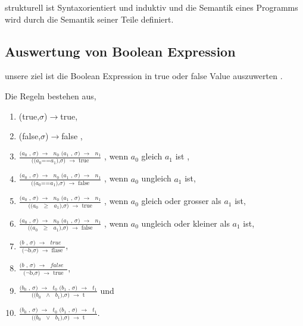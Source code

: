 \documentclass[a4paper,12pt,twoside,headsepline]{scrartcl}
\begin{document}
 strukturell ist Syntaxorientiert und induktiv und  die Semantik eines Programms wird durch  die Semantik seiner Teile definiert.
              
\subsection{Auswertung von Boolean Expression}  

unsere ziel ist die Boolean Expression in true oder false Value auszuwerten . 

     
 Die Regeln bestehen aus, 
 \begin{enumerate}
 \item \label{11} (true,$\sigma$)$\to$true, 
	\item \label{12} (false,$\sigma$)$\to$false ,
	\item \label{13}  $\frac  {\text {($a_0$ , $\sigma$) $\to$ $n_0$   ($a_1$ , $\sigma$) $\to$ $n_1$} } { \text{(($a_0$==$a_1$),$\sigma$) $\to$ true} }$  
	, wenn $a_0$ gleich $a_1$ ist ,
	\item \label{14}  $\frac  {\text {($a_0$ , $\sigma$) $\to$ $n_0$   ($a_1$ , $\sigma$) $\to$ $n_1$} } { \text{(($a_0$==$a_1$),$\sigma$) $\to$ false} }$
	, wenn $a_0$ ungleich $a_1$ ist,
	\item \label{15}  $\frac  {\text {($a_0$ , $\sigma$) $\to$ $n_0$   ($a_1$ , $\sigma$) $\to$ $n_1$} } { \text{(($a_0$ $\geq$ $a_1$),$\sigma$) $\to$ true} }$
	, wenn $a_0$ gleich oder grosser als $a_1$ ist,
	\item \label{16}  $\frac  {\text {($a_0$ , $\sigma$) $\to$ $n_0$   ($a_1$ , $\sigma$) $\to$ $n_1$} } { \text{(($a_0$ $\geq$ $a_1$),$\sigma$) $\to$ false} }$
	, wenn $a_0$ ungleich oder kleiner als $a_1$ ist,
	
	\item \label{17} $\frac  {\text {($b$ , $\sigma$) $\to$ $true$ } } { \text{($\neg$b,$\sigma$) $\to$ flase} }$,
	\item \label{20} $\frac  {\text {($b$ , $\sigma$) $\to$ $false$ } } { \text{($\neg$b,$\sigma$) $\to$ true} }$,
	
	\item \label{18} $\frac  {\text {($b_0$ , $\sigma$) $\to$ $t_0$   ($b_1$ , $\sigma$) $\to$ $t_1$} } { \text{(($b_0$ $\land$ $b_1$),$\sigma$) $\to$ t} }$ und
	\item \label{19} $\frac  {\text {($b_0$ , $\sigma$) $\to$ $t_0$   ($b_1$ , $\sigma$) $\to$ $t_1$} } { \text{(($b_0$ $\vee$ $b_1$),$\sigma$) $\to$ t} }$.	
\end{enumerate}
\end{document}
